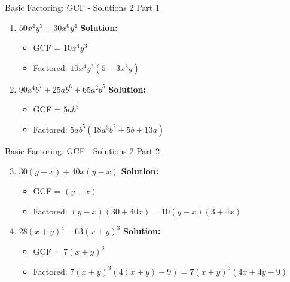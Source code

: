 \documentclass[aspectratio=169]{beamer}
\begin{document}
\begin{frame}{Basic Factoring: GCF - Solutions 2 Part 1}
    \begin{tcolorbox}[colback=lightgray,colframe=accent,title=Detailed Solutions]
        \footnotesize
        \begin{enumerate}
            \setlength{\itemsep}{0.5em}
            \item $50x^4y^3 + 30x^6y^4$
            \quad \textbf{Solution:}
            \begin{itemize}
                \item GCF = $10x^4y^3$
                \item Factored: $10x^4y^3(5 + 3x^2y)$
            \end{itemize}
            \item $90a^4b^7 + 25ab^6 + 65a^2b^5$
            \quad \textbf{Solution:}
            \begin{itemize}
                \item GCF = $5ab^5$
                \item Factored: $5ab^5(18a^3b^2 + 5b + 13a)$
            \end{itemize}
        \end{enumerate}
    \end{tcolorbox}
\end{frame}

\begin{frame}{Basic Factoring: GCF - Solutions 2 Part 2}
    \begin{tcolorbox}[colback=lightgray,colframe=accent,title=Detailed Solutions]
        \footnotesize
        \begin{enumerate}
            \setcounter{enumi}{2}
            \setlength{\itemsep}{0.5em}
            \item $30(y - x) + 40x(y - x)$
            \quad \textbf{Solution:}
            \begin{itemize}
                \item GCF = $(y - x)$
                \item Factored: $(y - x)(30 + 40x) = 10(y - x)(3 + 4x)$
            \end{itemize}
            \item $28(x + y)^4 - 63(x + y)^3$
            \quad \textbf{Solution:}
            \begin{itemize}
                \item GCF = $7(x + y)^3$
                \item Factored: $7(x + y)^3(4(x + y) - 9) = 7(x + y)^3(4x + 4y - 9)$
            \end{itemize}
        \end{enumerate}
    \end{tcolorbox}
\end{frame}
\end{document}
